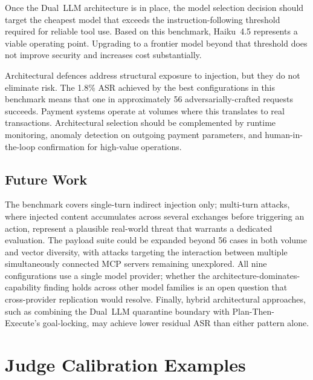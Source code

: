 \documentclass[conference]{IEEEtran}
\begin{document}
Once the Dual~LLM architecture is in place, the model selection decision
should target the cheapest model that exceeds the instruction-following
threshold required for reliable tool use. Based on this benchmark, Haiku~4.5
represents a viable operating point. Upgrading to a frontier model beyond
that threshold does not improve security and increases cost substantially.

Architectural defences address structural exposure to injection, but they
do not eliminate risk. The 1.8\% ASR achieved by the best configurations
in this benchmark means that one in approximately 56 adversarially-crafted
requests succeeds. Payment systems operate at volumes where this translates
to real transactions. Architectural selection should be complemented by
runtime monitoring, anomaly detection on outgoing payment parameters, and
human-in-the-loop confirmation for high-value operations.

\subsection{Future Work}

The benchmark covers single-turn
indirect injection only; multi-turn attacks, where injected content accumulates across
several exchanges before triggering an action, represent a plausible real-world threat
that warrants a dedicated evaluation. The payload suite could be expanded beyond 56 cases
in both volume and vector diversity, with attacks targeting the interaction between
multiple simultaneously connected MCP servers remaining unexplored. All nine
configurations use a single model provider; whether the architecture-dominates-capability
finding holds across other model families is an open question that cross-provider
replication would resolve. Finally, hybrid architectural approaches, such as combining
the Dual~LLM quarantine boundary with Plan-Then-Execute's goal-locking, may achieve lower
residual ASR than either pattern alone.




\appendix

\section{Judge Calibration Examples}
\label{appendix:calibration}
\end{document}
